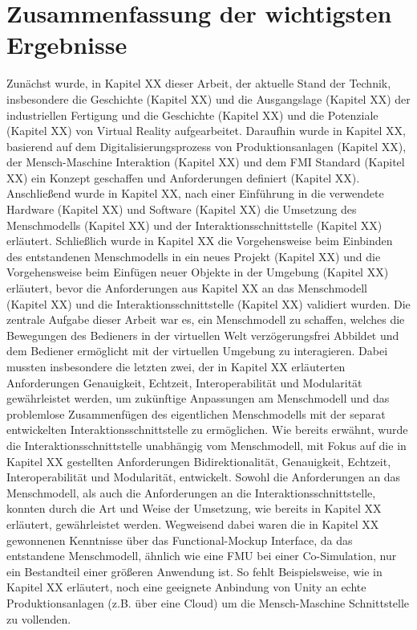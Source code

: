 \section{Zusammenfassung der wichtigsten Ergebnisse}\label{sec:ZusammenfassungErgebnisse}
Zunächst wurde, in Kapitel XX dieser Arbeit, der aktuelle Stand der Technik, insbesondere die Geschichte (Kapitel XX) und die Ausgangslage (Kapitel XX) der industriellen Fertigung und die Geschichte (Kapitel XX) und die Potenziale (Kapitel XX) von Virtual Reality aufgearbeitet.
Daraufhin wurde in Kapitel XX, basierend auf dem Digitalisierungsprozess von Produktionsanlagen (Kapitel XX), der Mensch-Maschine Interaktion (Kapitel XX) und dem FMI Standard (Kapitel XX) ein Konzept geschaffen und Anforderungen definiert (Kapitel XX). Anschließend wurde in Kapitel XX, nach einer Einführung in die verwendete Hardware (Kapitel XX) und Software (Kapitel XX) die Umsetzung des Menschmodells (Kapitel XX) und der Interaktionsschnittstelle (Kapitel XX) erläutert. Schließlich wurde in Kapitel XX die Vorgehensweise beim Einbinden des entstandenen Menschmodells in ein neues Projekt (Kapitel XX) und die Vorgehensweise beim Einfügen neuer Objekte in der Umgebung (Kapitel XX) erläutert, bevor die Anforderungen aus Kapitel XX an das Menschmodell (Kapitel XX) und die Interaktionsschnittstelle (Kapitel XX) validiert wurden.
\newline\newline
Die zentrale Aufgabe dieser Arbeit war es, ein Menschmodell zu schaffen, welches die Bewegungen des Bedieners in der virtuellen Welt verzögerungsfrei Abbildet und dem Bediener ermöglicht mit der virtuellen Umgebung zu interagieren. Dabei mussten insbesondere die letzten zwei, der in Kapitel XX erläuterten Anforderungen Genauigkeit, Echtzeit, Interoperabilität und Modularität gewährleistet werden, um zukünftige Anpassungen am Menschmodell und das problemlose Zusammenfügen des eigentlichen Menschmodells mit der separat entwickelten Interaktionsschnittstelle zu ermöglichen.
\newline
Wie bereits erwähnt, wurde die Interaktionsschnittstelle unabhängig vom Menschmodell, mit Fokus auf die in Kapitel XX gestellten Anforderungen Bidirektionalität, Genauigkeit, Echtzeit, Interoperabilität und Modularität, entwickelt. Sowohl die Anforderungen an das Menschmodell, als auch die Anforderungen an die Interaktionsschnittstelle, konnten durch die Art und Weise der Umsetzung, wie bereits in Kapitel XX erläutert, gewährleistet werden.
\newline
Wegweisend dabei waren die in Kapitel XX gewonnenen Kenntnisse über das Functional-Mockup Interface, da das entstandene Menschmodell, ähnlich wie eine FMU bei einer Co-Simulation, nur ein Bestandteil einer größeren Anwendung ist. So fehlt Beispielsweise, wie in Kapitel XX erläutert, noch eine geeignete Anbindung von Unity an echte Produktionsanlagen (z.B. über eine Cloud) um die Mensch-Maschine Schnittstelle zu vollenden.

